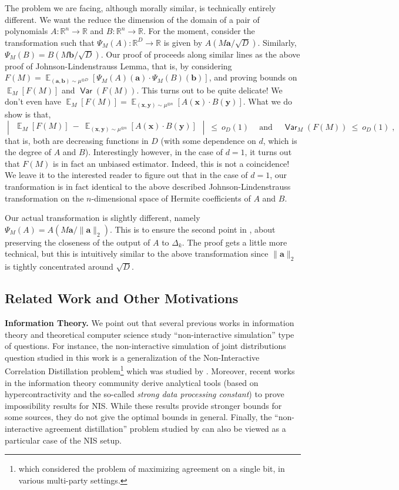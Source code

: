 \documentclass[11pt]{article}
\newcommand{\inabs}[1]{\begin{vmatrix} #1 \end{vmatrix}}
\DeclareMathOperator*{\Ex}{\mathbb{E}}
\DeclareMathOperator*{\Var}{\mathsf{Var}}
\newcommand{\sAND}{\ \mathrm{and} \ }
\newcommand{\bbR}{{\mathbb R}}
\newcommand{\ba}{{\bm a}}
\newcommand{\bb}{{\bm b}}
\newcommand{\bx}{{\bm x}}
\newcommand{\by}{{\bm y}}
\begin{document}
The problem we are facing, although morally similar, is technically entirely different. We want the reduce the dimension of the domain of a pair of polynomials $A : \bbR^n \to \bbR$ and $B : \bbR^n \to \bbR$. For the moment, consider the transformation such that $\Psi_M(A) : \bbR^D \to \bbR$ is given by $A(M\ba / \sqrt{D})$. Similarly, $\Psi_M(B) = B(M\bb/\sqrt{D})$. Our proof of  proceeds along similar lines as the above proof of Johnson-Lindenstrauss Lemma, that is, by considering $F(M) = \Ex_{(\ba,\bb)\sim \mu^{\otimes D}} [\Psi_M(A)(\ba) \cdot \Psi_M(B)(\bb)]$, and proving bounds on $\Ex_M [F(M)]$ and $\Var(F(M))$. This turns out to be quite delicate! We don't even have $\Ex_M[F(M)] = \Ex_{(\bx,\by)\sim \mu^{\otimes n}} [A(\bx) \cdot B(\by)]$. What we do show is that,
\[ \inabs{\Ex_M[F(M)] ~-~ \Ex_{(\bx,\by)\sim \mu^{\otimes n}} [A(\bx) \cdot B(\by)]} ~\le~ o_D(1) \quad \sAND \quad \Var_M(F(M)) ~\le~ o_D(1)\;, \]
that is, both are decreasing functions in $D$ (with some dependence on $d$, which is the degree of $A$ and $B$). Interestingly however, in the case of $d=1$, it turns out that $F(M)$ is in fact an unbiased estimator. Indeed, this is not a coincidence! We leave it to the interested reader to figure out that in the case of $d=1$, our tranformation is in fact identical to the above described Johnson-Lindenstrauss transformation on the $n$-dimensional space of Hermite coefficients of $A$ and $B$.

Our actual transformation is slightly different, namely $\Psi_M(A) = A(M\ba/\|\ba\|_2)$. This is to ensure the second point in , about preserving the closeness of the output of $A$ to $\Delta_k$. The proof gets a little more technical, but this is intuitively similar to the above transformation since $\|\ba\|_2$ is tightly concentrated around $\sqrt{D}$.

\subsection{Related Work and Other Motivations}

\textbf{Information Theory.} We point out that several previous works in information theory and theoretical computer science study ``non-interactive simulation'' type of questions. For instance, the non-interactive simulation of joint distributions question studied in this work is a generalization of the Non-Interactive Correlation Distillation problem\footnote{which considered the problem of maximizing agreement on a single bit, in various multi-party settings.} which was studied by \cite{mossel2004coin, mossel2006non}. Moreover, recent works in the information theory community \cite{kamath2015non,beigi2015duality} derive analytical tools (based on hypercontractivity and the so-called \emph{strong data processing constant}) to prove impossibility results for NIS. While these results provide stronger bounds for some sources, they do not give the optimal bounds in general. Finally, the ``non-interactive agreement distillation'' problem studied by \cite{bogdanov2011extracting} can also be viewed as a particular case of the NIS setup.
\end{document}

